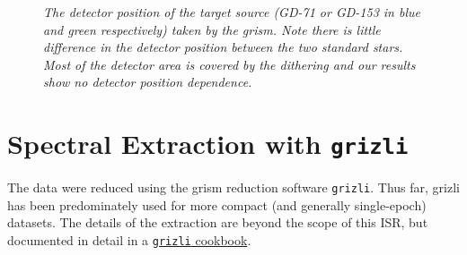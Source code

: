 \documentclass[12pt]{article}
\begin{document}
\begin{figure}[h!]
	\caption{\textit{The detector position of the target source (GD-71 or
        GD-153 in blue and green respectively) taken by the grism. Note there
        is little difference in the detector position between the two standard
        stars. 
        Most of the detector area is covered by the dithering and our results
        show no detector position dependence.}}
\label{fig:detector_pos}
\end{figure}

\section{Spectral Extraction with \texttt{grizli}}

The data were reduced using the grism reduction software \texttt{grizli}. Thus far, grizli 
has been predominately used for more compact (and generally single-epoch) datasets. The details of the
extraction are beyond the scope of this ISR, but documented in detail in a 
\href{http://grizli-calibration.readthedocs.io/en/latest/}{\color{blue} \texttt{grizli} cookbook}.
\end{document}
